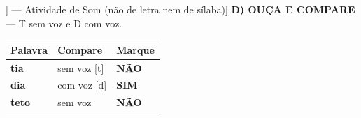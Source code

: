 \begin{exercicio}[Som /t/ [[t]] --- Atividade de Som (não de letra nem de sílaba)]
\textbf{D) OUÇA E COMPARE} --- T sem voz e D com voz.

\begin{center}
\begin{tabular}{@{}p{4.2cm}p{6.2cm}p{1.6cm}@{}}
\hline
\textbf{Palavra} & \textbf{Compare} & \textbf{Marque} \\
\hline
\textbf{tia} & sem voz [t] & \textbf{NÃO} \\
\textbf{dia} & com voz [d] & \textbf{SIM} \\
\textbf{teto} & sem voz & \textbf{NÃO} \\
\hline
\end{tabular}
\end{center}

\end{exercicio}

